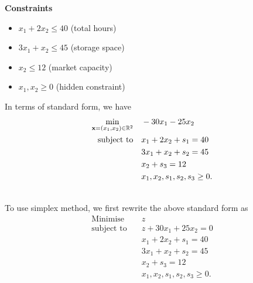 \begin{enumerate}
          \hfill
          \begin{minipage}[t]{0.45\textwidth}
              \textbf{Constraints}
              \begin{itemize}
                  \item \(x_1 + 2x_2 \leq 40\) (total hours)
                  \item \(3x_1 + x_2 \leq 45\) (storage space)
                  \item \(x_2 \leq 12\) (market capacity)
                  \item \(x_1, x_2 \geq 0\) (hidden constraint)
              \end{itemize}
              In terms of standard form, we have
              \begin{align*}
                  \min_{\mathbf{x} = (x_1, x_2) \in \mathbb{R}^2} \quad & -30x_1 - 25x_2                  \\
                  \text{subject to}\quad                  & x_1 + 2x_2 + s_1 = 40           \\
                                                          & 3x_1 + x_2 + s_2 = 45           \\
                                                          & x_2 + s_3 = 12                  \\
                                                          & x_1, x_2, s_1, s_2, s_3 \geq 0.
              \end{align*}
          \end{minipage} \\
          To use simplex method, we first rewrite the above standard form as
          \begin{align*}
              \text{Minimise} \quad  & z                               \\
              \text{subject to}\quad & z + 30x_1 + 25x_2 = 0           \\
                                     & x_1 + 2x_2 + s_1 = 40           \\
                                     & 3x_1 + x_2 + s_2 = 45           \\
                                     & x_2 + s_3 = 12                  \\
                                     & x_1, x_2, s_1, s_2, s_3 \geq 0.
          \end{align*}
          \begin{center}
              \begin{tabular}{|c|c|c c c c c|c|c|}

\end{tabular}
\end{center}
\end{enumerate}
